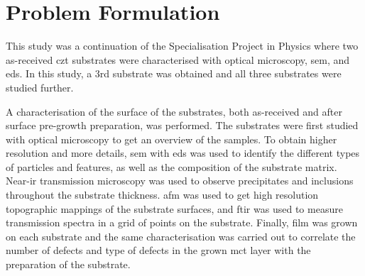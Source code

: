 \section{Problem Formulation}%

This study was a continuation of the Specialisation Project in Physics where two as-received \ac{czt} substrates were characterised with optical microscopy, \ac{sem}, and \ac{eds}. In this study, a 3rd substrate was obtained and all three substrates were studied further. 

A characterisation of the surface of the substrates, both as-received and after surface pre-growth preparation, was performed. The substrates were first studied with optical microscopy to get an overview of the samples. To obtain higher resolution and more details, \ac{sem} with \ac{eds} was used to identify the different types of particles and features, as well as the composition of the substrate matrix. Near-\ac{ir} transmission microscopy was used to observe precipitates and inclusions throughout the substrate thickness. \Ac{afm} was used to get high resolution topographic mappings of the substrate surfaces, and \ac{ftir} was used to measure transmission spectra in a grid of points on the substrate. Finally,  film was grown on each substrate and the same characterisation was carried out to correlate the number of defects and type of defects in the grown \ac{mct} layer with the preparation of the substrate.

